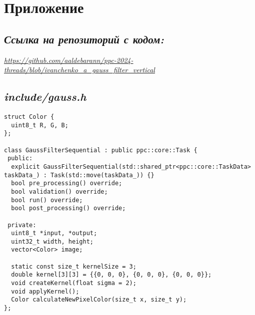 \documentclass{article}
\begin{document}
\section*{Приложение}
\subsection*{\emph{Ссылка на репозиторий с кодом:}}
\textit{\href{https://github.com/aaldebarann/ppc-2024-threads/blob/ivanchenko_a_gauss_filter_vertical}{https://github.com/aaldebarann/ppc-2024-threads/blob/ivanchenko\_a\_gauss\_filter\_vertical}}
\subsection*{\emph{include/gauss.h}}
\begin{lstlisting}
struct Color {
  uint8_t R, G, B;
};

class GaussFilterSequential : public ppc::core::Task {
 public:
  explicit GaussFilterSequential(std::shared_ptr<ppc::core::TaskData> taskData_) : Task(std::move(taskData_)) {}
  bool pre_processing() override;
  bool validation() override;
  bool run() override;
  bool post_processing() override;

 private:
  uint8_t *input, *output;
  uint32_t width, height;
  vector<Color> image;

  static const size_t kernelSize = 3;
  double kernel[3][3] = {{0, 0, 0}, {0, 0, 0}, {0, 0, 0}};
  void createKernel(float sigma = 2);
  void applyKernel();
  Color calculateNewPixelColor(size_t x, size_t y);
};
\end{lstlisting}
\end{document}
